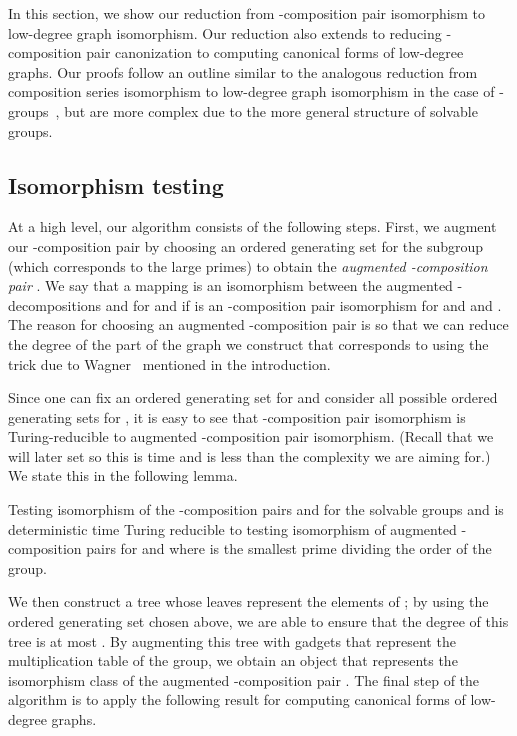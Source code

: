 In this section, we show our reduction from -composition pair isomorphism to low-degree graph isomorphism.  Our reduction also extends to reducing -composition pair canonization to computing canonical forms of low-degree graphs.  Our proofs follow an outline similar to the analogous reduction from composition series isomorphism to low-degree graph isomorphism in the case of -groups~\cite{rosenbaum2013c}, but are more complex due to the more general structure of solvable groups.

\subsection{Isomorphism testing}
At a high level, our algorithm consists of the following steps.  First, we augment our -composition pair  by choosing an ordered generating set  for the subgroup  (which corresponds to the large primes) to obtain the \emph{augmented -composition pair} .  We say that a mapping  is an isomorphism between the augmented -decompositions  and  for  and  if  is an -composition pair isomorphism for  and  and .  The reason for choosing an augmented -composition pair is so that we can reduce the degree of the part of the graph we construct that corresponds to  using the trick due to Wagner~\cite{wagner2011a} mentioned in the introduction.

Since one can fix an ordered generating set  for  and consider all possible ordered generating sets for , it is easy to see that -composition pair isomorphism is  Turing-reducible to augmented -composition pair isomorphism.  (Recall that we will later set  so this is  time and is less than the complexity we are aiming for.)  We state this in the following lemma.

\begin{lemma}
  \label{lem:alpha-comp-red}
  Testing isomorphism of the -composition pairs  and  for the solvable groups  and  is  deterministic time Turing reducible to testing isomorphism of augmented -composition pairs for  and  where  is the smallest prime dividing the order of the group.
\end{lemma}

We then construct a tree whose leaves represent the elements of ; by using the ordered generating set  chosen above, we are able to ensure that the degree of this tree is at most .  By augmenting this tree with gadgets that represent the multiplication table of the group, we obtain an object that represents the isomorphism class of the augmented -composition pair .  The final step of the algorithm is to apply the following result for computing canonical forms of low-degree graphs.

